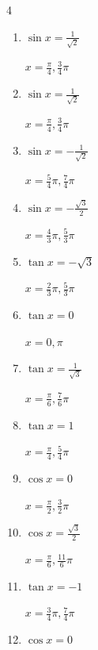 \begin{multicols}{4}
\begin{enumerate}
  \item $\displaystyle \sin{x}  = \frac{1}{\sqrt{2}}$

        $\displaystyle x = \frac{\pi}{4} , \frac{3}{4}\pi$

  \item $\displaystyle \sin{x}  = \frac{1}{\sqrt{2}}$

        $\displaystyle x = \frac{\pi}{4} , \frac{3}{4}\pi$

  \item $\displaystyle \sin{x}  = -\frac{1}{\sqrt{2}}$

        $\displaystyle x = \frac{5}{4}\pi , \frac{7}{4}\pi$

  \item $\displaystyle \sin{x}  = -\frac{\sqrt{3}}{2}$

        $\displaystyle x = \frac{4}{3}\pi , \frac{5}{3}\pi$

  \item $\displaystyle \tan{x}  = -\sqrt{3}$

        $\displaystyle x = \frac{2}{3}\pi , \frac{5}{3}\pi$

\columnbreak %

  \item $\displaystyle \tan{x}  = 0$

        $\displaystyle x = 0 , \pi$

  \item $\displaystyle \tan{x}  = \frac{1}{\sqrt{3}}$

        $\displaystyle x = \frac{\pi}{6} , \frac{7}{6}\pi$

  \item $\displaystyle \tan{x}  = 1$

        $\displaystyle x = \frac{\pi}{4} , \frac{5}{4}\pi$

  \item $\displaystyle \cos{x}  = 0$

        $\displaystyle x = \frac{\pi}{2} , \frac{3}{2}\pi$

  \item $\displaystyle \cos{x}  = \frac{\sqrt{3}}{2}$

        $\displaystyle x = \frac{\pi}{6} , \frac{11}{6}\pi$

  \item $\displaystyle \tan{x}  = -1$

        $\displaystyle x = \frac{3}{4}\pi , \frac{7}{4}\pi$

  \item $\displaystyle \cos{x}  = 0$


\end{enumerate}
\end{multicols}
